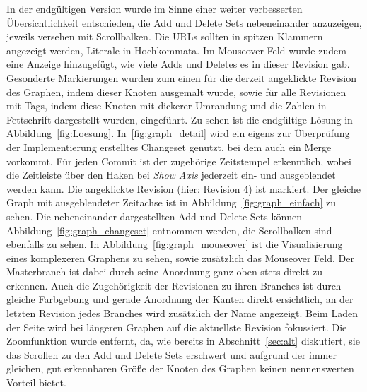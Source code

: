 \documentclass[nocolor]{tudbook}
\begin{document}
In der endgültigen Version wurde im Sinne einer weiter verbesserten Übersichtlichkeit entschieden, die Add und Delete Sets nebeneinander anzuzeigen, jeweils versehen mit Scrollbalken. Die URLs sollten in spitzen Klammern angezeigt werden, Literale in Hochkommata. Im Mouseover Feld wurde zudem eine Anzeige hinzugefügt, wie viele Adds und Deletes es in dieser Revision gab. Gesonderte Markierungen wurden zum einen für die derzeit angeklickte Revision des Graphen, indem dieser Knoten ausgemalt wurde, sowie für alle Revisionen mit Tags, indem diese Knoten mit dickerer Umrandung und die Zahlen in Fettschrift dargestellt wurden, eingeführt. Zu sehen ist die endgültige Lösung in Abbildung~\ref{fig:Loesung}. In~\ref{fig:graph_detail} wird ein eigens zur Überprüfung der Implementierung erstelltes Changeset genutzt, bei dem auch ein Merge vorkommt. Für jeden Commit ist der zugehörige Zeitstempel erkenntlich, wobei die Zeitleiste über den Haken bei \textit{Show Axis} jederzeit ein- und ausgeblendet werden kann. Die angeklickte Revision (hier: Revision 4) ist markiert. Der gleiche Graph mit ausgeblendeter Zeitachse ist in Abbildung~\ref{fig:graph_einfach} zu sehen. Die nebeneinander dargestellten Add und Delete Sets können Abbildung~\ref{fig:graph_changeset} entnommen werden, die Scrollbalken sind ebenfalls zu sehen. In Abbildung~\ref{fig:graph_mouseover} ist die Visualisierung eines komplexeren Graphens zu sehen, sowie zusätzlich das Mouseover Feld. Der Masterbranch ist dabei durch seine Anordnung ganz oben stets direkt zu erkennen. Auch die Zugehörigkeit der Revisionen zu ihren Branches ist durch gleiche Farbgebung und gerade Anordnung der Kanten direkt ersichtlich, an der letzten Revision jedes Branches wird zusätzlich der Name angezeigt. Beim Laden der Seite wird bei längeren Graphen auf die aktuellste Revision fokussiert. Die Zoomfunktion wurde entfernt, da, wie bereits in Abschnitt~\ref{sec:alt} diskutiert, sie das Scrollen zu den Add und Delete Sets erschwert und aufgrund der immer gleichen, gut erkennbaren Größe der Knoten des Graphen keinen nennenswerten Vorteil bietet.
\end{document}
